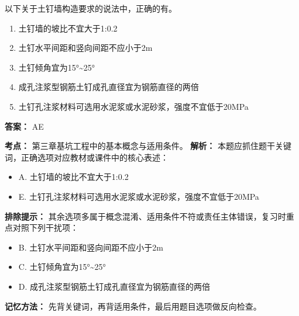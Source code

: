 \documentclass[UTF8,fontset=fandol,11pt]{ctexart}
\begin{document}
\begin{quizbox}[title={第 8 题}]
以下关于土钉墙构造要求的说法中，正确的有。\\
\begin{enumerate}[label=\Alph*.]
\item 土钉墙的坡比不宜大于1:0.2
\item 土钉水平间距和竖向间距不应小于2m
\item 土钉倾角宜为15°\textasciitilde{}25°
\item 成孔注浆型钢筋土钉成孔直径宜为钢筋直径的两倍
\item 土钉孔注浆材料可选用水泥浆或水泥砂浆，强度不宜低于20MPa
\end{enumerate}
\textbf{答案：} AE
\vspace{0.25em}
\begin{answerbox}[title={考点解析}]
\textbf{考点：} 第三章基坑工程中的基本概念与适用条件。
\textbf{解析：} 本题应抓住题干关键词，正确选项对应教材或课件中的核心表述：
\begin{itemize}
\item A. 土钉墙的坡比不宜大于1:0.2
\item E. 土钉孔注浆材料可选用水泥浆或水泥砂浆，强度不宜低于20MPa
\end{itemize}
\textbf{排除提示：} 其余选项多属于概念混淆、适用条件不符或责任主体错误，复习时重点对照下列干扰项：
\begin{itemize}
\item B. 土钉水平间距和竖向间距不应小于2m
\item C. 土钉倾角宜为15°\textasciitilde{}25°
\item D. 成孔注浆型钢筋土钉成孔直径宜为钢筋直径的两倍
\end{itemize}
\textbf{记忆方法：} 先背关键词，再背适用条件，最后用题目选项做反向检查。
\end{answerbox}
\end{quizbox}
\end{document}
